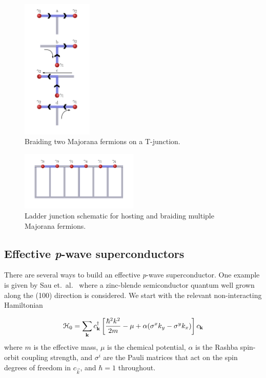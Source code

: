 \begin{figure}
  \includegraphics[width=0.3\textwidth]{./figures/t-junction-braid.pdf}
  \caption{Braiding two Majorana fermions on a T-junction.}
  \label{fig:t-junction-braid}
\end{figure}

\begin{figure}
  \includegraphics[width=0.5\textwidth]{./figures/ladder-junction.pdf}
  \caption{Ladder junction schematic for hosting and braiding multiple Majorana fermions.}
  \label{fig:ladder-junction}
\end{figure}

\subsection{Effective \textit{p}-wave superconductors}
There are several ways to build an effective \textit{p}-wave superconductor.
One example is given by Sau et.\ al.~\cite{sauGenericNewPlatform2010} where a zinc-blende semiconductor quantum well grown along the (100) direction is considered.
We start with the relevant non-interacting Hamiltonian

\begin{equation}
  \mathcal{H}_0 = \sum_{\mathbf{k}}  c^{\dagger}_{\mathbf{k}} \left[\frac{\hbar^2 k^2}{2m} - \mu + \alpha ( \sigma^x k_y - \sigma^y k_x) \right] c_{\mathbf{k}}
\end{equation}
where $m$ is the effective mass, $\mu$ is the chemical potential, $\alpha$ is the Rashba spin-orbit coupling strength, and $\sigma^i$ are the Pauli matrices that act on the spin degrees of freedom in $c_{\vec{k}}$, and $\hbar=1$ throughout.

